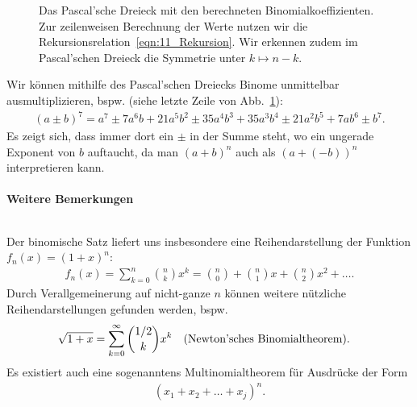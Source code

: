 \begin{figure}[htp]
    \centering
    \caption{Das Pascal'sche Dreieck mit den berechneten Binomialkoeffizienten. Zur zeilenweisen Berechnung der Werte nutzen wir die Rekursionsrelation~\eqref{eqn:11_Rekursion}. Wir erkennen zudem im Pascal'schen Dreieck die Symmetrie unter $k \mapsto n-k$.}
    \label{fig:11_Pascal2}
\end{figure}

Wir können mithilfe des Pascal'schen Dreiecks Binome unmittelbar ausmultiplizieren, bspw. (siehe letzte Zeile von Abb.~\ref{fig:11_Pascal2}): 
\begin{align}
    (a \pm b)^7 = a^7 \pm 7 a^6 b + 21 a^5 b^2 \pm 35 a^4 b^3 + 35 a^3 b^4 \pm 21 a^2 b^5 + 7 ab^6 \pm b^7.
\end{align}
Es zeigt sich, dass immer dort ein $\pm$ in der Summe steht, wo ein ungerade Exponent von $b$ auftaucht, da man $(a+b)^n$ auch als $(a+(-b))^n$ interpretieren kann.

\paragraph{Weitere Bemerkungen}$~$

Der binomische Satz liefert uns insbesondere eine Reihendarstellung der Funktion $f_n(x) = (1+x)^n$: 
\begin{align}
    f_n(x) = \sum_{k=0}^n \binom{n}{k} x^k = \binom{n}{0} + \binom{n}{1} x + \binom{n}{2} x^2 + \hdots.
\end{align}
Durch Verallgemeinerung auf nicht-ganze $n$ können weitere nützliche Reihendarstellungen gefunden werden, bspw. 
\begin{align}
    \sqrt{1+x} = \sum_{k=0}^\infty \binom{1/2}{k} x^k \qq{(Newton'sches Binomialtheorem).}
\end{align}
Es existiert auch eine sogenanntens Multinomialtheorem für Ausdrücke der Form 
\begin{align}
    (x_1 + x_2 + \hdots + x_j)^n.
\end{align}